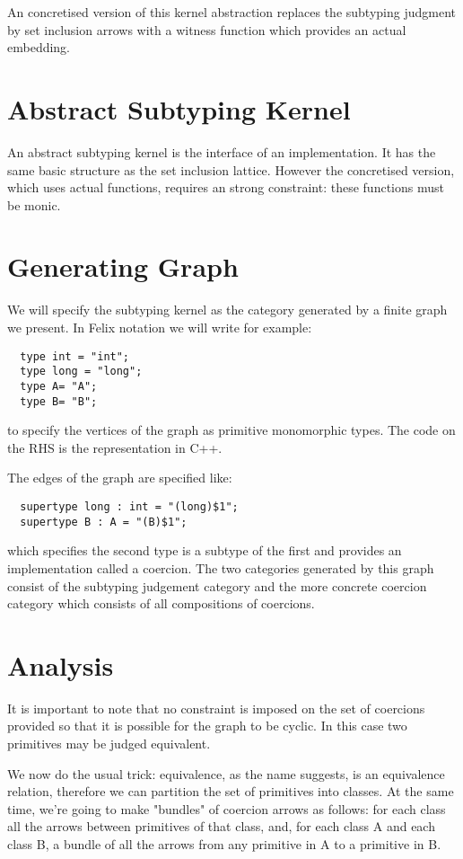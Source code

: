 \documentclass[oneside]{book}
\begin{document}
An concretised version of this kernel abstraction replaces the subtyping 
judgment by set inclusion arrows with a witness function which provides an actual embedding.

\section{Abstract Subtyping Kernel}
An abstract subtyping kernel is the interface of an implementation.
It has the same basic structure as the set inclusion lattice. 
However the concretised version, which uses actual functions, requires
an strong constraint: these functions must be monic.

\section{Generating Graph}
We will specify the subtyping kernel as the category generated by
a finite graph we present. In Felix notation we will write for example:

\begin{verbatim}
  type int = "int";
  type long = "long";
  type A= "A";
  type B= "B";
\end{verbatim}

to specify the vertices of the graph as primitive monomorphic types. 
The code on the RHS is the representation in C++.

The edges of the graph are specified like:

\begin{verbatim}
  supertype long : int = "(long)$1";
  supertype B : A = "(B)$1";
\end{verbatim}

which specifies the second type is a subtype of the first and
provides an implementation called a coercion. The two categories generated
by this graph consist of the subtyping judgement category and the more
concrete coercion category which consists of all compositions of 
coercions.

\section{Analysis}
It is important to note that no constraint is imposed on the set of 
coercions provided so that it is possible for the graph to be cyclic.
In this case two primitives may be judged equivalent. 

We now do the usual trick: equivalence, as the name suggests, is
an equivalence relation, therefore we can partition the set of
primitives into classes. At the same time, we're going to make
"bundles" of coercion arrows as follows: for each class all the
arrows between primitives of that class, and, for each class A and
each class B, a bundle of all the arrows from any primitive in A to
a primitive in B.
\end{document}
